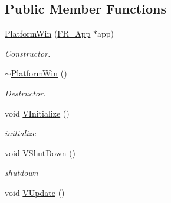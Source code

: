 \subsection*{Public Member Functions}
\begin{DoxyCompactItemize}
\item 
\hypertarget{classPlatform_1_1PlatformWin_a37cdf9af9f512c0c8a2fbd1e68134b6c}{
\hyperlink{classPlatform_1_1PlatformWin_a37cdf9af9f512c0c8a2fbd1e68134b6c}{PlatformWin} (\hyperlink{classFramework_1_1App}{FR\_\-App} $\ast$app)}
\label{classPlatform_1_1PlatformWin_a37cdf9af9f512c0c8a2fbd1e68134b6c}

\begin{DoxyCompactList}\small\item\em Constructor. \item\end{DoxyCompactList}\item 
\hypertarget{classPlatform_1_1PlatformWin_a987f9fbaf7c50c713bd2284fa1d31b42}{
\hyperlink{classPlatform_1_1PlatformWin_a987f9fbaf7c50c713bd2284fa1d31b42}{$\sim$PlatformWin} ()}
\label{classPlatform_1_1PlatformWin_a987f9fbaf7c50c713bd2284fa1d31b42}

\begin{DoxyCompactList}\small\item\em Destructor. \item\end{DoxyCompactList}\item 
\hypertarget{classPlatform_1_1PlatformWin_a1818fc5d3c9f325de7f3ff53d9f6c499}{
void \hyperlink{classPlatform_1_1PlatformWin_a1818fc5d3c9f325de7f3ff53d9f6c499}{VInitialize} ()}
\label{classPlatform_1_1PlatformWin_a1818fc5d3c9f325de7f3ff53d9f6c499}

\begin{DoxyCompactList}\small\item\em initialize \item\end{DoxyCompactList}\item 
\hypertarget{classPlatform_1_1PlatformWin_aee506753456bf2170ebaa9eb1bdc8215}{
void \hyperlink{classPlatform_1_1PlatformWin_aee506753456bf2170ebaa9eb1bdc8215}{VShutDown} ()}
\label{classPlatform_1_1PlatformWin_aee506753456bf2170ebaa9eb1bdc8215}

\begin{DoxyCompactList}\small\item\em shutdown \item\end{DoxyCompactList}\item 
\hypertarget{classPlatform_1_1PlatformWin_a4b4d67cc0ebed17aefa48712478c69b6}{
void \hyperlink{classPlatform_1_1PlatformWin_a4b4d67cc0ebed17aefa48712478c69b6}{VUpdate} ()}
\label{classPlatform_1_1PlatformWin_a4b4d67cc0ebed17aefa48712478c69b6}


\end{DoxyCompactItemize}
